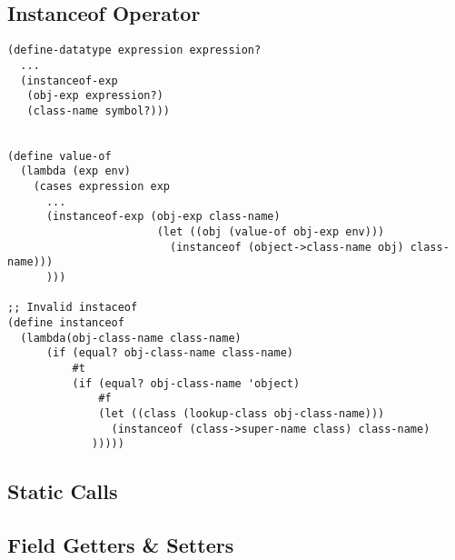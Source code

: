 \documentclass[../main.tex]{subfiles}
\begin{document}
\subsection{Instanceof Operator}

\begin{lstlisting}
(define-datatype expression expression?
  ...
  (instanceof-exp
   (obj-exp expression?)
   (class-name symbol?)))


(define value-of
  (lambda (exp env)
    (cases expression exp
      ...
      (instanceof-exp (obj-exp class-name)
                       (let ((obj (value-of obj-exp env)))
                         (instanceof (object->class-name obj) class-name)))
      )))

;; Invalid instaceof
(define instanceof
  (lambda(obj-class-name class-name)
      (if (equal? obj-class-name class-name)
          #t
          (if (equal? obj-class-name 'object)
              #f
              (let ((class (lookup-class obj-class-name)))
                (instanceof (class->super-name class) class-name)
             )))))
\end{lstlisting}

\subsection{Static Calls}

\subsection{Field Getters \& Setters}
\end{document}

